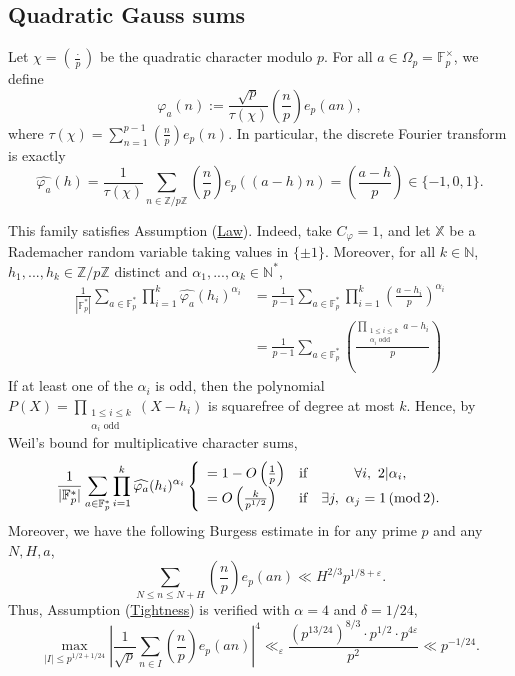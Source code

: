 \documentclass[12pt]{amsart}
\theoremstyle{definition}
\numberwithin{equation}{section}
\numberwithin{equation}{section}
\def\F{\mathbb{F}}
\def\N{\mathbb{N}}
\def\Z{\mathbb{Z}}
\def\mod{\mathrm{mod}}
\def\Mp{C_\varphi}
\def\X{\mathbb{X}}
\begin{document}
\subsection{Quadratic Gauss sums}

Let \(\chi=\left(\frac{\cdot}{p}\right)\) be the quadratic character modulo \(p\). For all \(a\in \Omega_p=\F_p^\times\), we define
\[
\varphi_a(n):=
\frac{\sqrt p}{\tau(\chi)}
\left(\frac np\right)e_p(an),
\]
where
$\tau(\chi)=\sum_{n=1}^{p-1}\left(\frac np\right)e_p(n).$
In particular, the discrete Fourier transform is exactly
\[
\widehat{\varphi_a}(h)
=
\frac{1}{\tau(\chi)}
\sum_{n\in\Z/p\Z}
\left(\frac np\right)e_p((a-h)n)
=
\left(\frac{a-h}{p}\right)\in\{-1,0,1\}.
\]

This family satisfies Assumption (\hyperlink{Ass Law}{Law}). Indeed, take \(\Mp=1\), and let \(\X\) be a Rademacher random variable taking values in \(\{\pm1\}\). 
Moreover, for all $k\in \N$, $h_1,...,h_k\in\Z/p\Z$ distinct and $\alpha_1,...,\alpha_k\in \N^*,$
\begin{align*}
\frac{1}{|\F_p^*|}
\sum_{a\in\F_p^*} \prod_{i = 1}^k \widehat{\varphi_a}(h_i)^{\alpha_i}
&=\frac{1}{p-1}\sum_{a\in\F_p^*} \prod_{i = 1}^{k} \left(\frac{a-h_i}{p}\right)^{\alpha_i}\\
&=\frac{1}{p-1}\sum_{a\in\F_p^*}  \left(\frac{ \prod_{\substack{1\le i\le k\\ \alpha_i\text{ odd}}}a-h_i}{p}\right)
\end{align*}
If at least one of the $\alpha_i$ is odd, then the polynomial $P(X)=\prod_{\substack{1\le i\le k\\ \alpha_i\text{ odd}}}(X-h_i)$
is squarefree of degree at most $k$. Hence, by Weil’s bound for multiplicative character sums,
\begin{align*}
\frac{1}{|\F_p^*|}
\sum_{a\in\F_p^*} \prod_{i = 1}^k \widehat{\varphi_a}(h_i)^{\alpha_i}
&\left\{
\begin{array}{l cc l}
         =1 - O\left(\frac{1}{p }\right)  & \text{if}  & \forall i,\,\,2|\alpha_i,\\
     = O\left( \frac{k}{p^{1/2}}\right)& \text{if}  & \exists j,\,\,\alpha_j=1\,(\mod\, 2). 
\end{array}
\right.
\end{align*}
Moreover, we have the following Burgess estimate in \cite{Bur89} for any prime \(p\) and any \(N,H,a\),
$$
\sum_{N\leq n\leq N+H} \left(\frac{n}{p}\right)e_p(an) \ll  H^{2/3} p^{1/8+\varepsilon}. $$
Thus, Assumption (\hyperlink{Ass Tightness}{Tightness}) is verified with $\alpha = 4$ and $\delta =1/24$,
\[
\max_{|I|\leq p^{1/2+1/24}}\left|
\frac{1}{\sqrt{p}}\sum_{n\in I} \left(\frac{n}{p}\right)e_p(an)
\right|^{4} 
\ll_\varepsilon 
\frac{(p^{13/24})^{8/3}\cdot p^{1/2}\cdot p^{4\varepsilon}}{p^2}
\ll
p^{-1/24}.
\]
\end{document}
